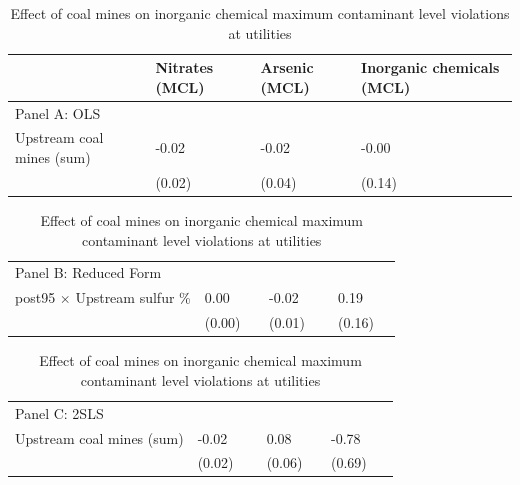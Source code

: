 \begin{table}[htbp]
\raggedright
\begin{minipage}{14.5cm}
\caption{\label{2sls_dwnstrm_minevio_mcl_ivsum_binvio} Effect of coal mines on inorganic chemical maximum contaminant level violations at utilities}
\end{minipage}
\small
{\setlength{\tabcolsep}{4pt}%
\begin{tabular}{p{5.5cm}>{\raggedleft\arraybackslash}p{3cm}>{\raggedleft\arraybackslash}p{3cm}>{\raggedleft\arraybackslash}p{3cm}}
\hline\hline
 & Nitrates (MCL) & Arsenic (MCL) & Inorganic chemicals (MCL) \\
\hline
\multicolumn{4}{l}{Panel A: OLS} \\
Upstream coal mines (sum) & \phantom{(}-0.02$^{\phantom{*}\phantom{*}\phantom{*}}$ & \phantom{(}-0.02$^{\phantom{*}\phantom{*}\phantom{*}}$ & \phantom{(}-0.00$^{\phantom{*}\phantom{*}\phantom{*}}$ \\
 & (\phantom{-}0.02)\phantom{$^{***}$} & (\phantom{-}0.04)\phantom{$^{***}$} & (\phantom{-}0.14)\phantom{$^{***}$} \\
\end{tabular}
\begin{tabular}{p{5.5cm}>{\raggedleft\arraybackslash}p{3cm}>{\raggedleft\arraybackslash}p{3cm}>{\raggedleft\arraybackslash}p{3cm}}
\hline
\multicolumn{4}{l}{Panel B: Reduced Form} \\
post95 $\times$ Upstream sulfur \% & \phantom{(}\phantom{-}0.00$^{\phantom{*}\phantom{*}\phantom{*}}$ & \phantom{(}-0.02$^{\phantom{*}\phantom{*}\phantom{*}}$ & \phantom{(}\phantom{-}0.19$^{\phantom{*}\phantom{*}\phantom{*}}$ \\
 & (\phantom{-}0.00)\phantom{$^{***}$} & (\phantom{-}0.01)\phantom{$^{***}$} & (\phantom{-}0.16)\phantom{$^{***}$} \\
\end{tabular}
\begin{tabular}{p{5.5cm}>{\raggedleft\arraybackslash}p{3cm}>{\raggedleft\arraybackslash}p{3cm}>{\raggedleft\arraybackslash}p{3cm}}
\hline
\multicolumn{4}{l}{Panel C: 2SLS} \\
Upstream coal mines (sum) & \phantom{(}-0.02$^{\phantom{*}\phantom{*}\phantom{*}}$ & \phantom{(}\phantom{-}0.08$^{\phantom{*}\phantom{*}\phantom{*}}$ & \phantom{(}-0.78$^{\phantom{*}\phantom{*}\phantom{*}}$ \\
 & (\phantom{-}0.02)\phantom{$^{***}$} & (\phantom{-}0.06)\phantom{$^{***}$} & (\phantom{-}0.69)\phantom{$^{***}$} \\

\end{tabular}}
\end{table}
